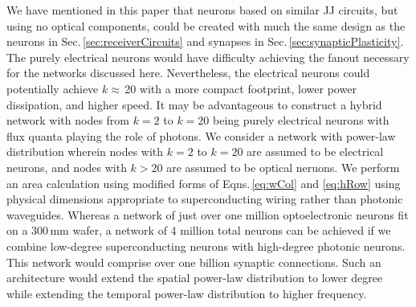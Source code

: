 \documentclass[aip,amsmath,amssymb,reprint,nofootinbib]{revtex4-1}
\begin{document}
We have mentioned in this paper that neurons based on similar JJ circuits, but using no optical components, could be created with much the same design as the neurons in Sec.\,\ref{sec:receiverCircuits} and synapses in Sec.\,\ref{sec:synapticPlasticity}. The purely electrical neurons would have difficulty achieving the fanout necessary for the networks discussed here. Nevertheless, the electrical neurons could potentially achieve $k\approx$\,20 with a more compact footprint, lower power dissipation, and higher speed. It may be advantageous to construct a hybrid network with nodes from $k = 2$ to $k = 20$ being purely electrical neurons with flux quanta playing the role of photons. We consider a network with power-law distribution wherein nodes with $k = 2$ to $k = 20$ are assumed to be electrical neurons, and nodes with $k > 20$ are assumed to be optical neruons. We perform an area calculation using modified forms of Eqns.\,\ref{eq:wCol} and \ref{eq:hRow} using physical dimensions appropriate to superconducting wiring rather than photonic waveguides. Whereas a network of just over one million optoelectronic neurons fit on a 300\,mm wafer, a network of 4 million total neurons can be achieved if we combine low-degree superconducting neurons with high-degree photonic neurons. This network would comprise over one billion synaptic connections. Such an architecture would extend the spatial power-law distribution to lower degree while extending the temporal power-law distribution to higher frequency. 
\end{document}
